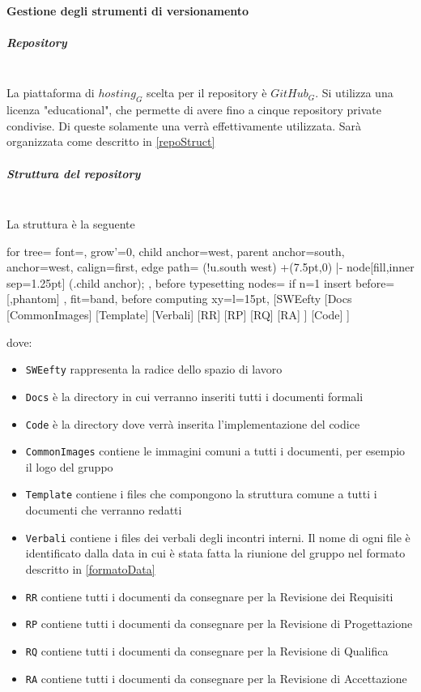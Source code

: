 		\paragraph{Gestione degli strumenti di versionamento}
			\subparagraph{Repository}\mbox{} \\
			La piattaforma di $hosting_G$ scelta per il repository è $GitHub_G$. Si utilizza una licenza "educational", che permette di avere fino a cinque repository private condivise. Di queste solamente una verrà effettivamente utilizzata. Sarà organizzata come descritto in \ref{repoStruct}
			\subparagraph{Struttura del repository}\mbox{} \\
			\label{repoStruct}
			La struttura è la seguente\\
			\begin{center}
			\begin{forest}
				for tree={
					font=\ttfamily,
					grow'=0,
					child anchor=west,
					parent anchor=south,
					anchor=west,
					calign=first,
					edge path={
						\noexpand{}
						(!u.south west) +(7.5pt,0) |- node[fill,inner sep=1.25pt] {} (.child anchor);
					},
					before typesetting nodes={
						if n=1
						{insert before={[,phantom]}}
						{}
					},
					fit=band,
					before computing xy={l=15pt},
				}
				[SWEefty
					[Docs
						[CommonImages]
						[Template]
						[Verbali]
						[RR]
						[RP]
						[RQ]
						[RA]
					]
					[Code]
				]
			\end{forest}
			\end{center}
			dove:
			\begin{itemize}
				\item \texttt{SWEefty} rappresenta la radice dello spazio di lavoro
				\item \texttt{Docs} è la directory in cui verranno inseriti tutti i documenti formali
				\item \texttt{Code} è la directory dove verrà inserita l'implementazione del codice
				\item \texttt{CommonImages} contiene le immagini comuni a tutti i documenti, per esempio il logo del gruppo
				\item \texttt{Template} contiene i files che compongono la struttura comune a tutti i documenti che verranno redatti
				\item \texttt{Verbali} contiene i files dei verbali degli incontri interni. Il nome di ogni file è identificato dalla data in cui è stata fatta la riunione del gruppo nel formato descritto in \ref{formatoData} \color{red}{dove sta sto formato data?}
				\item \texttt{RR} contiene tutti i documenti da consegnare per la Revisione dei Requisiti
				\item \texttt{RP} contiene tutti i documenti da consegnare per la Revisione di Progettazione
				\item \texttt{RQ} contiene tutti i documenti da consegnare per la Revisione di Qualifica
				\item \texttt{RA} contiene tutti i documenti da consegnare per la Revisione di Accettazione
				  				
			\end{itemize}
			
